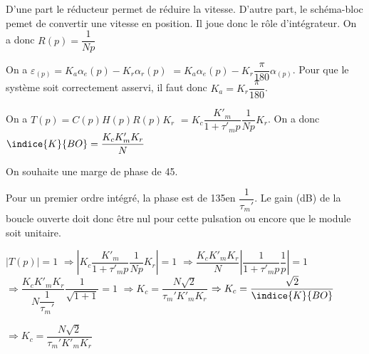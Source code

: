 \ifprof
\begin{corrige}
D'une part le réducteur permet de réduire la vitesse. D'autre part, le schéma-bloc pemet de convertir une vitesse en position. Il joue donc le rôle d'intégrateur. On a donc $R(p)=\dfrac{1}{Np}$
\end{corrige}
\else
\fi


\ifprof
\begin{corrige}
On a 
$\varepsilon_(p)=K_a \alpha_e(p) - K_r \alpha_r(p) $
$=K_a \alpha_e(p) - K_r \dfrac{\pi}{180}\alpha_(p) $.
Pour que le système soit correctement asservi, il faut donc  $K_a =  K_r \dfrac{\pi}{180}$.
\end{corrige}
\else
\fi


\ifprof
\begin{corrige}
On a $T(p)= C(p)H(p)R(p)K_r$ 
$=K_c \dfrac{K'_m}{1+\tau'_m p}\dfrac{1}{Np} K_r  $. On a donc $\indice{K}{BO}=\dfrac{K_c K'_mK_r}{N} $
\end{corrige}
\else
\fi

On souhaite une marge de phase de 45\degres.

\ifprof
\begin{corrige}
Pour un premier ordre intégré, la phase est de 135\degres en $\dfrac{1}{\tau_m'}$. Le  gain (dB) de la boucle ouverte doit donc être nul pour cette pulsation ou encore que le module soit unitaire.

$|T(p)|=1$ 
$\Rightarrow \left| K_c \dfrac{K'_m}{1+\tau'_m p}\dfrac{1}{Np} K_r \right| = 1$ 
$\Rightarrow \dfrac{K_c K'_m K_r}{N} \left| \dfrac{1}{1+\tau'_m p}\dfrac{1}{p}  \right| = 1$ 
$\Rightarrow \dfrac{K_c K'_m K_r}{N\dfrac{1}{\tau_m'}}  \dfrac{1}{\sqrt{1+1 }}   = 1$ 
$\Rightarrow K_c   = \dfrac{N\sqrt{2}}{\tau_m' K'_m K_r}$ 
$\Rightarrow K_c   = \dfrac{\sqrt{2}}{\indice{K}{BO}}$ 

\end{corrige}
\else
\fi



\ifprof
\begin{corrige}
$\Rightarrow K_c   = \dfrac{N\sqrt{2}}{\tau_m' K'_m K_r}$ 
\end{corrige}
\else
\fi



